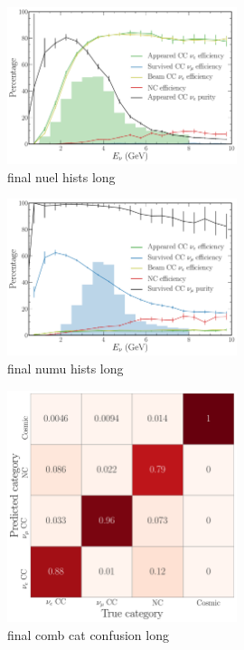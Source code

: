 \begin{figure} %
    \includegraphics[width=0.6\textwidth]{diagrams/6-cvn/chipsnet/final_nuel_hists.pdf}
    \caption[final nuel hists short]
    {final nuel hists long}
    \label{fig:final_nuel_hists}
\end{figure}

\begin{figure} %
    \includegraphics[width=0.6\textwidth]{diagrams/6-cvn/chipsnet/final_numu_hists.pdf}
    \caption[final numu hists short]
    {final numu hists long}
    \label{fig:final_numu_hists}
\end{figure}

\begin{figure} %
    \includegraphics[width=0.6\textwidth]{diagrams/6-cvn/chipsnet/final_comb_cat_confusion.pdf}
    \caption[final comb cat confusion short]
    {final comb cat confusion long}
    \label{fig:final_comb_cat_confusion}
\end{figure}

